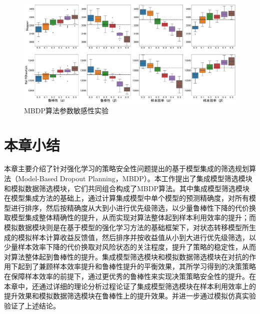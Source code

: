 \begin{figure}[t]
  \centering
  \includegraphics[width=\textwidth]{figures/hyper-performance.pdf}
  \caption{MBDP算法参数敏感性实验}
  \label{fig:hyper-performance}
\end{figure}

\section{本章小结}

本章主要介绍了针对强化学习的策略安全性问题提出的基于模型集成的筛选规划算法（Model-Based Dropout Planning，MBDP）。本工作提出了集成模型筛选模块和模拟数据筛选模块，它们共同组合构成了MBDP算法。其中集成模型筛选模块在模型集成方法的基础上，通过计算集成模型中单个模型的预测精确度，对所有模型进行排序，然后按精确度从大到小进行优先级筛选，以少量鲁棒性下降的代价换取模型集成整体精确性的提升，从而实现对算法整体起到样本利用效率的提升；而模拟数据模块则是在基于模型的强化学习方法的基础框架下，对状态转移模型所生成的模拟样本计算收益反馈值，然后排序并按收益值从小到大进行优先级筛选，以少量样本效率下降的代价换取对风险状态的关注程度，提升了策略的稳定性，从而对算法整体起到鲁棒性的提升。集成模型筛选模块和模拟数据筛选模块在对抗的作用下起到了兼顾样本效率提升和鲁棒性提升的平衡效果，其所学习得到的决策策略在保障样本效率的前提下，通过更优秀的鲁棒性来实现决策策略安全性的提升。在本章中，还通过详细的理论分析过程论证了集成模型筛选模块在样本利用效率上的提升效果和模拟数据筛选模块在鲁棒性上的提升效果。并进一步通过模拟仿真实验验证了上述结论。